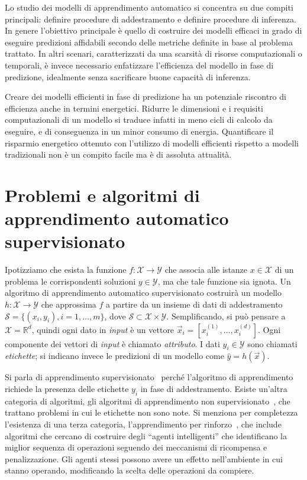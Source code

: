 Lo studio dei modelli di apprendimento automatico si concentra su due compiti principali: definire procedure di addestramento e definire procedure di inferenza. 
In genere l'obiettivo principale è quello di costruire dei modelli efficaci in grado di eseguire predizioni affidabili secondo delle metriche definite in base al problema trattato. 
In altri scenari, caratterizzati da una scarsità di risorse computazionali o temporali, è invece necessario enfatizzare l'efficienza del modello in fase di predizione, idealmente senza sacrificare buone capacità di inferenza.

Creare dei modelli efficienti in fase di predizione ha un potenziale riscontro di efficienza anche in termini energetici.
Ridurre le dimensioni e i requisiti computazionali di un modello si traduce infatti in meno cicli di calcolo da eseguire, e di conseguenza in un minor consumo di energia.
Quantificare il risparmio energetico ottenuto con l'utilizzo di modelli efficienti rispetto a modelli tradizionali non è un compito facile ma è di assoluta attualità.

\section{Problemi e algoritmi di apprendimento automatico supervisionato}\label{sec:tipi_problemi_ml}
Ipotizziamo che esista la funzione $f:\mathcal{X}\rightarrow\mathcal{Y}$ che associa alle istanze $x \in \mathcal{X}$ di un problema le corrispondenti soluzioni $y \in \mathcal{Y}$, ma che tale funzione sia ignota. 
Un algoritmo di apprendimento automatico supervisionato costruirà un modello $h:\mathcal{X}\rightarrow\mathcal{Y}$ che approssima $f$ a partire da un insieme di dati di addestramento $\mathcal{S}=\{(x_i, y_i), i=1,\dots,m\}$, dove $\mathcal{S} \subset \mathcal{X} \times \mathcal{Y}$.
Semplificando, si può pensare a $\mathcal{X} = \mathbb{R}^d$, quindi ogni dato in \emph{input} è un vettore $\Vec{x}_i=[x_i^{(1)},\dots,x_i^{(d)}]$.
Ogni componente dei vettori di \emph{input} è chiamato \emph{attributo}.
I dati $y_i \in \mathcal{Y}$ sono chiamati \emph{etichette}; si indicano invece le predizioni di un modello come $\hat{y} = h(\Vec{x})$. 

Si parla di apprendimento supervisionato~\cite{elements-of-statistical-learning} perché l'algoritmo di apprendimento richiede la presenza delle etichette $y_i$ in fase di addestramento.
Esiste un'altra categoria di algoritmi, gli algoritmi di apprendimento non supervisionato~\cite{unsupervised_learning}, che trattano problemi in cui le etichette non sono note.
Si menziona per completezza l'esistenza di una terza categoria, l'apprendimento per rinforzo~\cite{reinforcement_learning}, che include algoritmi che cercano di costruire degli ``agenti intelligenti'' che identificano la miglior sequenza di operazioni seguendo dei meccanismi di ricompensa e penalizzazione. 
Gli agenti stessi possono avere un effetto nell'ambiente in cui stanno operando, modificando la scelta delle operazioni da compiere.

